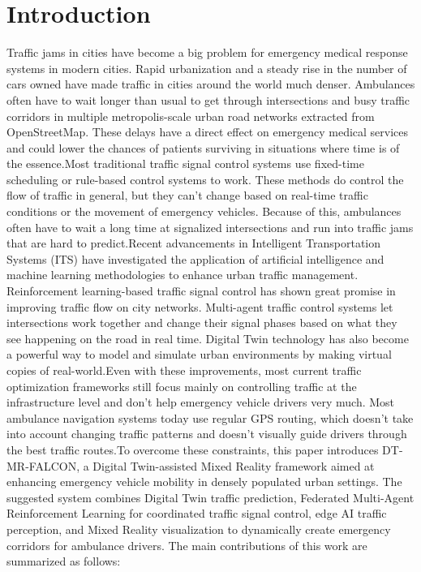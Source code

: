 \documentclass[conference]{IEEEtran}
\begin{document}
\section{Introduction}
Traffic jams in cities have become a big problem for emergency medical response systems in modern cities. Rapid urbanization and a steady rise in the number of cars owned have made traffic in cities around the world much denser. Ambulances often have to wait longer than usual to get through intersections and busy traffic corridors in multiple metropolis-scale urban road networks extracted from OpenStreetMap. These delays have a direct effect on emergency medical services and could lower the chances of patients surviving in situations where time is of the essence.Most traditional traffic signal control systems use fixed-time scheduling or rule-based control systems to work. These methods do control the flow of traffic in general, but they can't change based on real-time traffic conditions or the movement of emergency vehicles. Because of this, ambulances often have to wait a long time at signalized intersections and run into traffic jams that are hard to predict.Recent advancements in Intelligent Transportation Systems (ITS) have investigated the application of artificial intelligence and machine learning methodologies to enhance urban traffic management. Reinforcement learning-based traffic signal control has shown great promise in improving traffic flow on city networks. Multi-agent traffic control systems let intersections work together and change their signal phases based on what they see happening on the road in real time. Digital Twin technology has also become a powerful way to model and simulate urban environments by making virtual copies of real-world.Even with these improvements, most current traffic optimization frameworks still focus mainly on controlling traffic at the infrastructure level and don't help emergency vehicle drivers very much. Most ambulance navigation systems today use regular GPS routing, which doesn't take into account changing traffic patterns and doesn't visually guide drivers through the best traffic routes.To overcome these constraints, this paper introduces DT-MR-FALCON, a Digital Twin-assisted Mixed Reality framework aimed at enhancing emergency vehicle mobility in densely populated urban settings. The suggested system combines Digital Twin traffic prediction, Federated Multi-Agent Reinforcement Learning for coordinated traffic signal control, edge AI traffic perception, and Mixed Reality visualization to dynamically create emergency corridors for ambulance drivers.
The main contributions of this work are summarized as follows:
\end{document}
